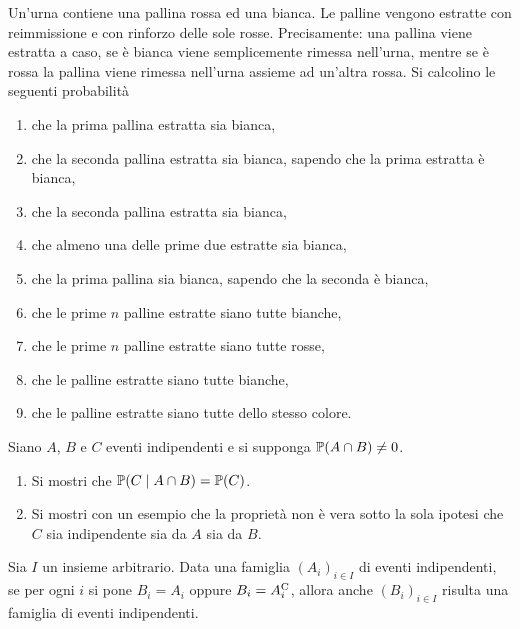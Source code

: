 Un'urna contiene una pallina rossa ed una bianca. Le palline vengono estratte con reimmissione e con rinforzo delle sole rosse. Precisamente: una pallina viene estratta a caso, se è bianca viene semplicemente rimessa nell'urna, mentre se è rossa la pallina viene rimessa nell'urna assieme ad un'altra rossa. Si calcolino le seguenti probabilità
\begin{enumerate}
	\item che la prima pallina estratta sia bianca,
	\item che la seconda pallina estratta sia bianca, sapendo che la prima estratta è bianca,
	\item che la seconda pallina estratta sia bianca,
	\item che almeno una delle prime due estratte sia bianca,
	\item che la prima pallina sia bianca, sapendo che la seconda è bianca,
	\item che le prime $n$ palline estratte siano tutte bianche,
	\item che le prime $n$ palline estratte siano tutte rosse,
	\item che le palline estratte siano tutte bianche,
	\item che le palline estratte siano tutte dello stesso colore.
\end{enumerate}

\Esercizio{}

Siano $A$, $B$ e $C$ eventi indipendenti e si supponga $\mathbb{P}(A\cap B) \neq 0$.
\begin{enumerate}
	\item Si mostri che $\mathbb{P}(C\mid A\cap B) =\mathbb{P}(C)$.
	\item Si mostri con un esempio che la proprietà non è vera sotto la sola ipotesi che $C$ sia indipendente sia da $A$ sia da $B$.
\end{enumerate}

\Esercizio{}

Sia $I$ un insieme arbitrario. Data una famiglia $(A_{i})_{i\in I}$ di eventi indipendenti, se per ogni $i$ si pone $B_{i} =A_{i}$ oppure $B_{i} =A_{i}^{\mathrm{C}}$, allora anche $(B_{i})_{i\in I}$ risulta una famiglia di eventi indipendenti.

\ParteSoluzioni

\Soluzione

